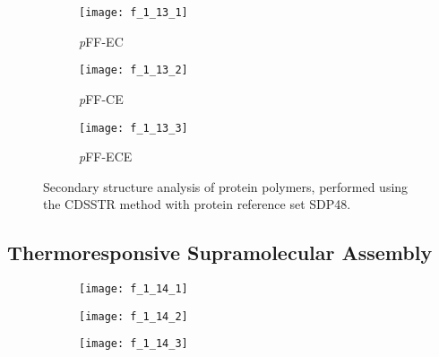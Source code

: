 \begin{refsection}
\begin{figure}[h!]
    \centering
    \begin{subfigure}[b]{0.32\textwidth}
        \centering
        \texttt{[image: f\_1\_13\_1]}
        \caption{\emph{p}FF-EC}
        \label{fig:CDcomp_ECpFF}
    \end{subfigure}
    \begin{subfigure}[b]{0.32\textwidth}
        \centering
        \texttt{[image: f\_1\_13\_2]}
        \caption{\emph{p}FF-CE}
        \label{fig:CDcomp_CEpFF}
    \end{subfigure}
    \begin{subfigure}[b]{0.32\textwidth}
        \centering
        \texttt{[image: f\_1\_13\_3]}
        \caption{\emph{p}FF-ECE}
        \label{fig:CDcomp_ECEpFF}
    \end{subfigure}
    \caption{Secondary structure analysis of protein polymers, performed using
    the CDSSTR method with protein reference set SDP48.}\label{fig:CD_computation}
\end{figure}
\subsection{Thermoresponsive Supramolecular Assembly}
\label{sec:lcst}
\begin{figure}[h!]
    \centering
    \begin{subfigure}[b]{0.32\textwidth}
        \texttt{[image: f\_1\_14\_1]}
        \caption{}
        \label{fig:LCST_ECpFF}
    \end{subfigure}
    \begin{subfigure}[b]{0.32\textwidth}
        \texttt{[image: f\_1\_14\_2]}
        \caption{}
        \label{fig:LCST_CEpFF}
    \end{subfigure}
    \begin{subfigure}[b]{0.32\textwidth}
        \texttt{[image: f\_1\_14\_3]}
        \caption{}
        \label{fig:LCST_ECEpFF}
    \end{subfigure}


\end{figure}
\end{refsection}
